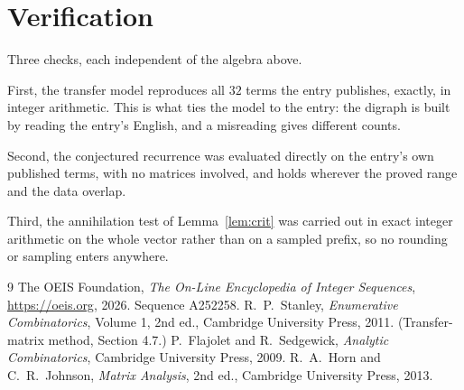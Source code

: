 \documentclass[11pt,a4paper]{article}
\theoremstyle{plain}
\theoremstyle{definition}
\begin{document}
\section{Verification}

Three checks, each independent of the algebra above.

First, the transfer model reproduces all $32$ terms the entry publishes, exactly, in
integer arithmetic. This is what ties the model to the entry: the digraph is built by reading
the entry's English, and a misreading gives different counts.

Second, the conjectured recurrence was evaluated directly on the entry's own published terms,
with no matrices involved, and holds wherever the proved range and the data overlap.

Third, the annihilation test of Lemma~\ref{lem:crit} was carried out in exact integer
arithmetic on the whole vector rather than on a sampled prefix, so no rounding or sampling
enters anywhere.

\begin{thebibliography}{9}
 The OEIS Foundation, \emph{The On-Line Encyclopedia of Integer
Sequences}, \url{https://oeis.org}, 2026. Sequence A252258.
 R.~P.~Stanley, \emph{Enumerative Combinatorics}, Volume 1, 2nd ed.,
Cambridge University Press, 2011. (Transfer-matrix method, Section 4.7.)
 P.~Flajolet and R.~Sedgewick, \emph{Analytic Combinatorics}, Cambridge
University Press, 2009.
 R.~A.~Horn and C.~R.~Johnson, \emph{Matrix Analysis}, 2nd ed., Cambridge
University Press, 2013.
\end{thebibliography}
\end{document}
